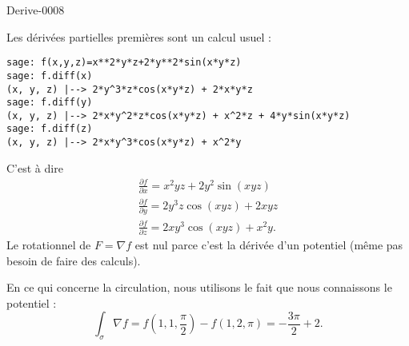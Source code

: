 
\begin{corrige}{Derive-0008}

    Les dérivées partielles premières sont un calcul usuel :
    \begin{verbatim}
sage: f(x,y,z)=x**2*y*z+2*y**2*sin(x*y*z)                                                                                                                   
sage: f.diff(x)
(x, y, z) |--> 2*y^3*z*cos(x*y*z) + 2*x*y*z
sage: f.diff(y)
(x, y, z) |--> 2*x*y^2*z*cos(x*y*z) + x^2*z + 4*y*sin(x*y*z)
sage: f.diff(z)
(x, y, z) |--> 2*x*y^3*cos(x*y*z) + x^2*y
    \end{verbatim}
    C'est à dire
    \begin{subequations}
        \begin{align}
            \frac{ \partial f }{ \partial x }=x^2yz+2y^2\sin(xyz)\\
            \frac{ \partial f }{ \partial y }=2y^3z\cos(xyz)+2xyz\\
            \frac{ \partial f }{ \partial z }=2xy^3\cos(xyz)+x^2y.
        \end{align}
    \end{subequations}
    Le rotationnel de \( F=\nabla f\) est nul parce c'est la dérivée d'un potentiel (même pas besoin de faire des calculs).

    En ce qui concerne la circulation, nous utilisons le fait que nous connaissons le potentiel :
    \begin{equation}
        \int_{\sigma}\nabla f=f(1,1,\frac{ \pi }{2})-f(1,2,\pi)=-\frac{ 3\pi }{2}+2.
    \end{equation}

\end{corrige}
